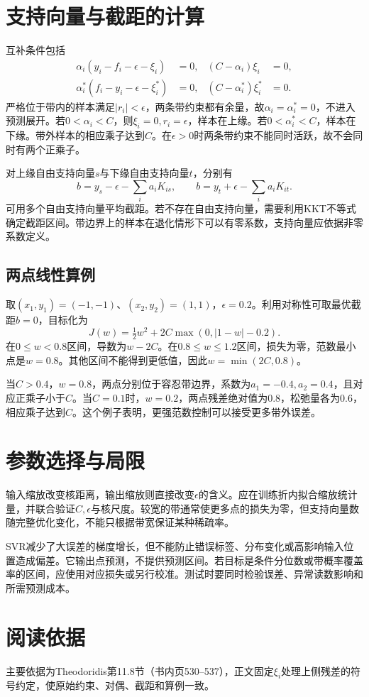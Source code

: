 \section{支持向量与截距的计算}
互补条件包括
\begin{align}
 \alpha_i(y_i-f_i-\epsilon-\xi_i)&=0,
 &(C-\alpha_i)\xi_i&=0,\\
 \alpha_i^*(f_i-y_i-\epsilon-\xi_i^*)&=0,
 &(C-\alpha_i^*)\xi_i^*&=0.
\end{align}
严格位于带内的样本满足$|r_i|<\epsilon$，两条带约束都有余量，故$\alpha_i=\alpha_i^*=0$，不进入预测展开。若$0<\alpha_i<C$，则$\xi_i=0,r_i=\epsilon$，样本在上缘。若$0<\alpha_i^*<C$，样本在下缘。带外样本的相应乘子达到$C$。在$\epsilon>0$时两条带约束不能同时活跃，故不会同时有两个正乘子。

对上缘自由支持向量$s$与下缘自由支持向量$t$，分别有
\begin{equation}
 b=y_s-\epsilon-\sum_i a_iK_{is},\qquad
 b=y_t+\epsilon-\sum_i a_iK_{it}.
\end{equation}
可用多个自由支持向量平均截距。若不存在自由支持向量，需要利用KKT不等式确定截距区间。带边界上的样本在退化情形下可以有零系数，支持向量应依据非零系数定义。

\subsection{两点线性算例}
取$(x_1,y_1)=(-1,-1)$、$(x_2,y_2)=(1,1)$，$\epsilon=0.2$。利用对称性可取最优截距$b=0$，目标化为
\begin{equation}
 J(w)=\tfrac12w^2+2C\max(0,|1-w|-0.2).
\end{equation}
在$0\le w<0.8$区间，导数为$w-2C$。在$0.8\le w\le1.2$区间，损失为零，范数最小点是$w=0.8$。其他区间不能得到更低值，因此$w=\min(2C,0.8)$。

当$C>0.4$，$w=0.8$，两点分别位于容忍带边界，系数为$a_1=-0.4,a_2=0.4$，且对应正乘子小于$C$。当$C=0.1$时，$w=0.2$，两点残差绝对值为0.8，松弛量各为0.6，相应乘子达到$C$。这个例子表明，更强范数控制可以接受更多带外误差。

\section{参数选择与局限}
输入缩放改变核距离，输出缩放则直接改变$\epsilon$的含义。应在训练折内拟合缩放统计量，并联合验证$C,\epsilon$与核尺度。较宽的带通常使更多点的损失为零，但支持向量数随完整优化变化，不能只根据带宽保证某种稀疏率。

SVR减少了大误差的梯度增长，但不能防止错误标签、分布变化或高影响输入位置造成偏差。它输出点预测，不提供预测区间。若目标是条件分位数或带概率覆盖率的区间，应使用对应损失或另行校准。测试时要同时检验误差、异常读数影响和所需预测成本。

\section{阅读依据}
主要依据为Theodoridis第11.8节（书内页530--537），正文固定$\xi_i$处理上侧残差的符号约定，使原始约束、对偶、截距和算例一致。
